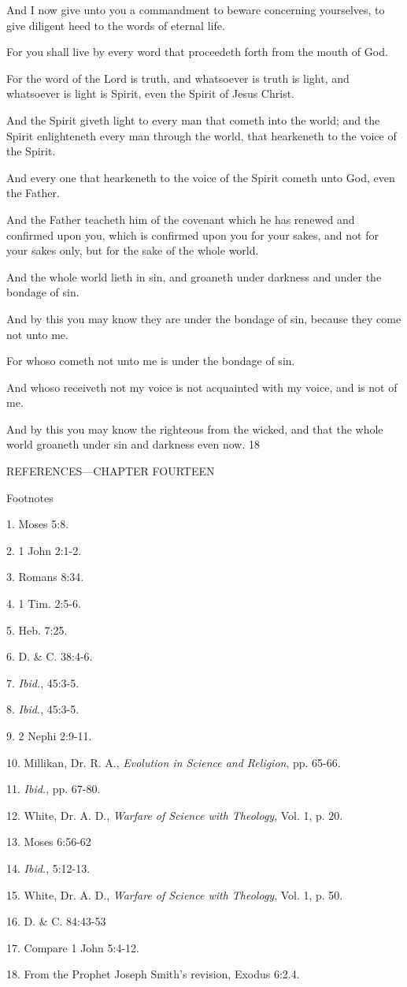 And I now give unto you a commandment to beware concerning yourselves, to give diligent
heed to the words of eternal life.

For you shall live by every word that proceedeth forth from the mouth of God.

For the word of the Lord is truth, and whatsoever is truth is light, and whatsoever is light is
Spirit, even the Spirit of Jesus Christ.

And the Spirit giveth light to every man that cometh into the world; and the Spirit
enlighteneth every man through the world, that hearkeneth to the voice of the Spirit.

And every one that hearkeneth to the voice of the Spirit cometh unto God, even the Father.

And the Father teacheth him of the covenant which he has renewed and confirmed upon you,
which is confirmed upon you for your sakes, and not for your sakes only, but for the sake of
the whole world.

And the whole world lieth in sin, and groaneth under darkness and under the bondage of sin.

And by this you may know they are under the bondage of sin, because they come not unto
me.

For whoso cometh not unto me is under the bondage of sin.

And whoso receiveth not my voice is not acquainted with my voice, and is not of me.

And by this you may know the righteous from the wicked, and that the whole world groaneth
under sin and darkness even now. 18

\newpage
REFERENCES—CHAPTER FOURTEEN

Footnotes

1. Moses 5:8.

2. 1 John 2:1-2.

3. Romans 8:34.

4. 1 Tim. 2:5-6.

5. Heb. 7:25.

6. D. \& C. 38:4-6.

7. \textit{Ibid.}, 45:3-5.

8. \textit{Ibid.}, 45:3-5.

9. 2 Nephi 2:9-11.

10. Millikan, Dr. R. A., \textit{Evolution in Science and Religion}, pp. 65-66.

11. \textit{Ibid.}, pp. 67-80.

12. White, Dr. A. D., \textit{Warfare of Science with Theology}, Vol. 1, p. 20.

13. Moses 6:56-62

14. \textit{Ibid.}, 5:12-13.

15. White, Dr. A. D., \textit{Warfare of Science with Theology}, Vol. 1, p. 50.

16. D. \& C. 84:43-53

17. Compare 1 John 5:4-12.

18. From the Prophet Joseph Smith's revision, Exodus 6:2.4.

